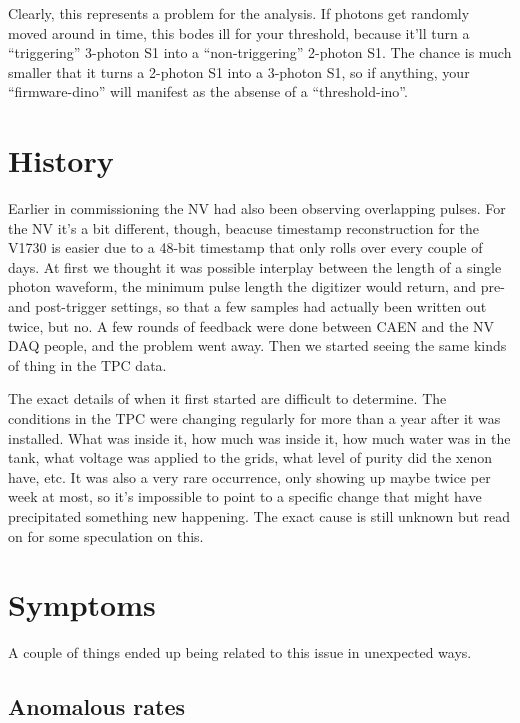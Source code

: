 Clearly, this represents a problem for the analysis.
If photons get randomly moved around in time, this bodes ill for your threshold, because it'll turn a ``triggering'' 3-photon S1 into a ``non-triggering'' 2-photon S1.
The chance is much smaller that it turns a 2-photon S1 into a 3-photon S1, so if anything, your ``firmware-dino'' will manifest as the absense of a ``threshold-ino''.

\section{History}

Earlier in commissioning the NV had also been observing overlapping pulses.
For the NV it's a bit different, though, beacuse timestamp reconstruction for the V1730 is easier due to a 48-bit timestamp that only rolls over every couple of days.
At first we thought it was possible interplay between the length of a single photon waveform, the minimum pulse length the digitizer would return, and pre- and post-trigger settings, so that a few samples had actually been written out twice, but no.
A few rounds of feedback were done between CAEN and the NV DAQ people, and the problem went away.
Then we started seeing the same kinds of thing in the TPC data.

The exact details of when it first started are difficult to determine.
The conditions in the TPC were changing regularly for more than a year after it was installed.
What was inside it, how much was inside it, how much water was in the tank, what voltage was applied to the grids, what level of purity did the xenon have, etc.
It was also a very rare occurrence, only showing up maybe twice per week at most, so it's impossible to point to a specific change that might have precipitated something new happening.
The exact cause is still unknown but read on for some speculation on this.

\section{Symptoms}

A couple of things ended up being related to this issue in unexpected ways.

\subsection{Anomalous rates}

